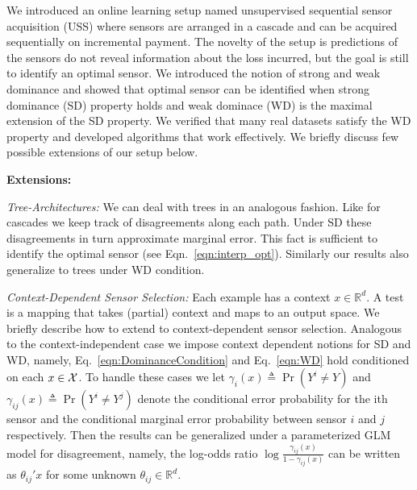 
We introduced an online learning setup named unsupervised sequential sensor acquisition (USS) where sensors are arranged in a cascade and can be acquired sequentially on incremental payment. The novelty of the setup is predictions of the sensors do not reveal information about the loss incurred, but the goal is still to identify an optimal sensor. We introduced the notion of strong and weak dominance and showed that optimal sensor can be identified when strong dominance (SD) property holds and weak dominace (WD) is the maximal extension of the SD property. We verified that many real datasets satisfy the WD property and developed algorithms that work effectively. We briefly discuss few possible extensions of our setup below.

\noindent
{\bf Extensions:}

\noindent
{\it Tree-Architectures:}
We can deal with trees in an analogous fashion. Like for cascades we keep track of disagreements along each path. Under SD these disagreements in turn approximate marginal error. This fact is sufficient to identify the optimal sensor (see Eqn.~\ref{eqn:interp_opt}). Similarly our results also generalize to trees under WD condition. 

\noindent
{\it Context-Dependent Sensor Selection:}
Each example has a context $x \in \mathbb{R}^d$. A test is a mapping that takes (partial) context and maps to an output space. We briefly describe how to extend to context-dependent sensor selection. Analogous to the context-independent case we impose context dependent notions for SD and WD, namely, Eq.~\ref{eqn:DominanceCondition} and Eq.~\ref{eqn:WD} hold conditioned on each $x \in {\cal X}$. To handle these cases we let $\gamma_i(x)\triangleq \Pr(Y^{i} \neq Y)$ and $\gamma_{ij}(x) \triangleq \Pr(Y^{i} \neq Y^{j})$ denote the conditional error probability for the ith sensor and the conditional marginal error probability between sensor $i$ and $j$ respectively. Then the results can be generalized under a parameterized GLM model for disagreement, namely, the log-odds ratio $\log \frac{\gamma_{ij}(x)}{1-\gamma_{ij}(x)}$ can be written as $\theta_{ij}'x$ for some unknown $\theta_{ij} \in \mathbb{R}^d$.
